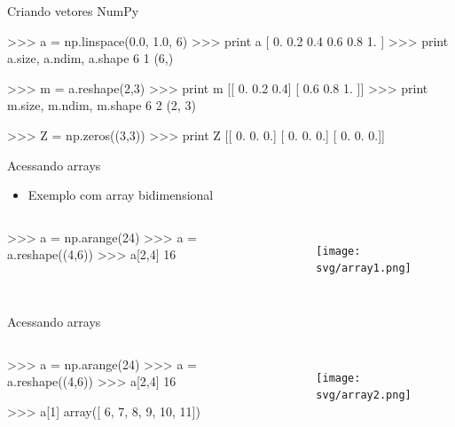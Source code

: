 \documentclass[12pt,t,graphics]{beamer}
\begin{document}

\begin{frame}[t,fragile]{Criando vetores NumPy}
\begin{python}
>>> a = np.linspace(0.0, 1.0, 6)
>>> print a
[ 0.   0.2  0.4  0.6  0.8  1. ]
>>> print a.size, a.ndim, a.shape    
6 1 (6,)
	
>>> m = a.reshape(2,3)
>>> print m
[[ 0.   0.2  0.4]
[ 0.6  0.8  1. ]]
>>> print m.size, m.ndim, m.shape
6 2 (2, 3)
	
>>> Z = np.zeros((3,3))
>>> print Z
[[ 0.  0.  0.]
[ 0.  0.  0.]
[ 0.  0.  0.]]
\end{python}
\end{frame}

\begin{frame}[t,fragile]{Acessando arrays}
	\begin{itemize}
		\item Exemplo com array bidimensional
	\end{itemize}
	\begin{columns}
		\begin{python}
		>>> a = np.arange(24)
		>>> a = a.reshape((4,6))
		>>> a[2,4]
		16
		\end{python}
		\begin{figure}
			\centering
			\texttt{[image: svg/array1.png]} 
		\end{figure}
	\end{columns}
\end{frame}

\begin{frame}[t,fragile]{Acessando arrays}
	\begin{columns}
		\column{.5\textwidth}
		\begin{python}
		>>> a = np.arange(24)
		>>> a = a.reshape((4,6))
		>>> a[2,4]
		16
		
		>>> a[1]
		array([ 6,  7,  8,  9, 10, 11])
		\end{python}
		\column{.5\textwidth}
		\begin{figure}
			\centering
			\texttt{[image: svg/array2.png]}
		\end{figure}
	\end{columns}
\end{frame}
\end{document}
